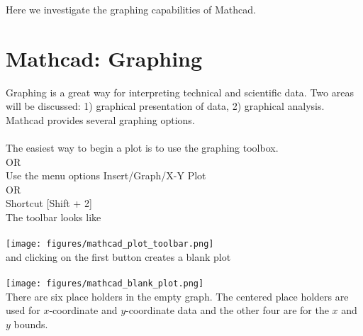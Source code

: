 Here we investigate the graphing capabilities of Mathcad.

\section{Mathcad: Graphing}\label{sec:Mathcadplots}

Graphing is a great way for interpreting technical and scientific data. Two areas will be
discussed: 1) graphical presentation of data, 2) graphical analysis. Mathcad provides several
graphing options.\\
\\
The easiest way to begin a plot is to use the graphing toolbox.\\
OR\\
Use the menu options Insert/Graph/X-Y Plot\\
OR\\
Shortcut [Shift + 2]\\

The toolbar looks like \\
\\
\texttt{[image: figures/mathcad\_plot\_toolbar.png]}\\

and clicking on the first button creates a blank plot\\
\\
\texttt{[image: figures/mathcad\_blank\_plot.png]}\\

There are six place holders in the empty graph. The centered place holders are used for
$x$-coordinate and $y$-coordinate data and the other four are for the $x$ and $y$ bounds.\\

